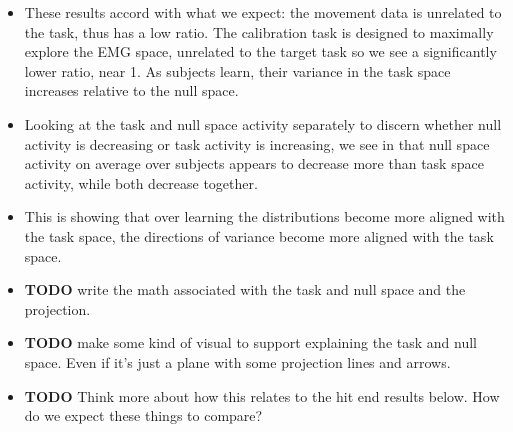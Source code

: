 \documentclass[../main.tex]{subfiles}
\begin{document}
\begin{itemize}
  \item These results accord with what we expect: the movement data is unrelated to the task, thus has a low ratio. The calibration task is designed to maximally explore the EMG space, unrelated to the target task so we see a significantly lower ratio, near 1. As subjects learn, their variance in the task space increases relative to the null space.
  \item Looking at the task and null space activity separately to discern whether null activity is decreasing or task activity is increasing, we see in  that null space activity on average over subjects appears to decrease more than task space activity, while both decrease together.
  \item This is showing that over learning the distributions become more aligned with the task space, the directions of variance become more aligned with the task space.
  \item \textbf{TODO} write the math associated with the task and null space and the projection. 
  \item \textbf{TODO} make some kind of visual to support explaining the task and null space. Even if it's just a plane with some projection lines and arrows.
  \item \textbf{TODO} Think more about how this relates to the hit end results below. How do we expect these things to compare?
\end{itemize}
 

\end{document}
